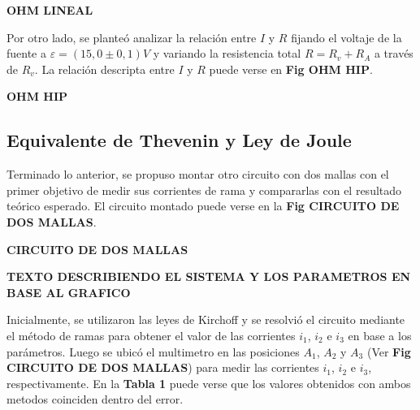 \documentclass[11pt,a4paper]{article}
\begin{document}
\textbf{OHM LINEAL}

Por otro lado, se planteó analizar la relación entre $I$ y $R$ fijando el voltaje de la fuente a $\varepsilon = (15,0 \pm 0,1)V$ y variando la resistencia total $R = R_v + R_A$ a través de $R_v$. La relación descripta entre $I$ y $R$ puede verse en \textbf{Fig OHM HIP}.

\textbf{OHM HIP}

\subsection{Equivalente de Thevenin y Ley de Joule}

Terminado lo anterior, se propuso montar otro circuito con dos mallas con el primer objetivo de medir sus corrientes de rama y compararlas con el resultado teórico esperado. El circuito montado puede verse en la \textbf{Fig CIRCUITO DE DOS MALLAS}.

\textbf{CIRCUITO DE DOS MALLAS}

\textbf{TEXTO DESCRIBIENDO EL SISTEMA Y LOS PARAMETROS EN BASE AL GRAFICO}

Inicialmente, se utilizaron las leyes de Kirchoff y se resolvió el circuito mediante el método de ramas para obtener el valor de las corrientes $i_1$, $i_2$ e $i_3$ en base a los parámetros. Luego se ubicó el multimetro en las posiciones $A_1$, $A_2$ y $A_3$ (Ver \textbf{Fig CIRCUITO DE DOS MALLAS})  para medir las corrientes $i_1$, $i_2$ e $i_3$, respectivamente. En la \textbf{Tabla 1} puede verse que los valores obtenidos con ambos metodos coinciden dentro del error. 
\end{document}
